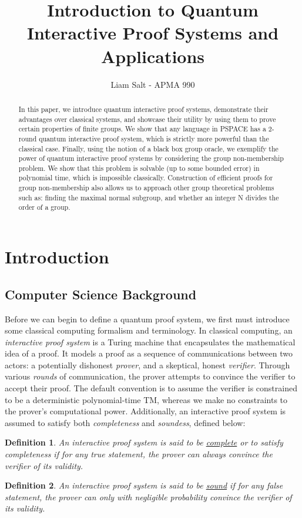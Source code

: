 \documentclass[12pt]{article}
\title{Introduction to Quantum Interactive Proof Systems and Applications}
\author{Liam Salt - APMA 990}
\newtheorem*{defn}{Definition}
\begin{document}
	\maketitle
	
	\begin{abstract}
		In this paper, we introduce quantum interactive proof systems, demonstrate their advantages over classical systems, and showcase their utility by using them to prove certain properties of finite groups. We show that any language in PSPACE has a $2$-round quantum interactive proof system, which is strictly more powerful than the classical case. Finally, using the notion of a black box group oracle, we exemplify the power of quantum interactive proof systems by considering the group non-membership problem. We show that this problem is solvable (up to some bounded error) in polynomial time, which is impossible classically. Construction of efficient proofs for group non-membership also allows us to approach other group theoretical problems such as: finding the maximal normal subgroup, and whether an integer N divides the order of a group.
	\end{abstract}
	\section{Introduction}
	
	\subsection{Computer Science Background}
	
	Before we can begin to define a quantum proof system, we first must introduce some classical computing formalism and terminology. In classical computing, an \textit{interactive proof system} is a Turing machine that encapsulates the mathematical idea of a proof. It models a proof as a sequence of communications between two actors: a potentially dishonest \textit{prover}, and a skeptical, honest \textit{verifier}. Through various \textit{rounds} of communication, the prover attempts to convince the verifier to accept their proof. The default convention is to assume the verifier is constrained to be a deterministic polynomial-time TM, whereas we make no constraints to the prover's computational power. Additionally, an interactive proof system is assumed to satisfy both \textit{completeness} and \textit{soundess}, defined below:
	\begin{defn}
		An interactive proof system is said to be \underline{complete} or to satisfy completeness if for any true statement, the prover can always convince the verifier of its validity.
	\end{defn}
	\begin{defn} An interactive proof system is said to be \underline{sound} if for any false statement, the prover can only with negligible probability convince the verifier of its validity.
	\end{defn}
\end{document}
